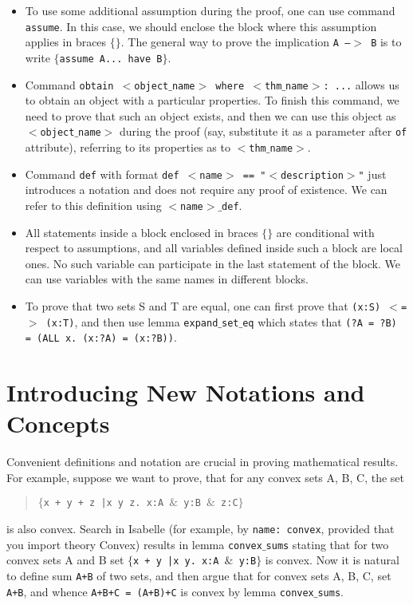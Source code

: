 \documentclass[11pt]{article}
\newcommand{\prog}[1]{\par\noindent\begin{quote}#1\end{quote}\par\noindent}
\begin{document}
\begin{itemize}

    \item To use some additional assumption during the proof, one can use command {\tt assume}. In this case, we should enclose the block where this assumption applies in braces $\{\}$. The general way to prove the implication {\tt A --$>$ B} is to write {\tt $\{$assume A... have B$\}$}.

    \item Command {\tt obtain $<$object$\_$name$>$ where $<$thm$\_$name$>$: ...} allows us to obtain an object with a particular properties. To finish this command, we need to prove that such an object exists, and then we can use this object as {\tt $<$object$\_$name$>$} during the proof (say, substitute it as a parameter after {\tt of} attribute), referring to its properties as to {\tt $<$thm$\_$name$>$}.

    \item  Command {\tt def} with format {\tt def $<$name$>$ == "$<$description$>$"} just introduces a notation and does not require any proof of existence. We can refer to this definition using {\tt $<$name$>\_$def}.

    \item All statements inside a block enclosed in braces $\{\}$ are conditional with respect to assumptions, and all variables defined inside such a block are local ones. No such variable can participate in the last statement of the block. We can use variables with the same names in different blocks.

    \item  To prove that two sets S and T are equal, one can first prove that {\tt (x:S) $<$=$>$ (x:T)}, and then use lemma {\tt expand$\_$set$\_$eq} which states that {\tt (?A = ?B) = (ALL x.~(x:?A) = (x:?B))}.

\end{itemize}


\section{Introducing New Notations and Concepts}

Convenient definitions and notation are crucial in proving mathematical results. For example, suppose we want to prove, that for any convex sets A, B, C, the set

\prog{\tt $\{$x + y + z |x y z.~x:A $\&$ y:B $\&$ z:C$\}$}%
is also convex. Search in Isabelle (for example, by {\tt name:~convex}, provided that you import theory Convex) results in lemma {\tt convex$\_$sums} stating that for two convex sets A and B set {\tt $\{$x + y |x y.~x:A $\&$ y:B$\}$} is convex. Now it is natural to define sum {\tt A+B} of two sets, and then argue that for convex sets A, B, C, set {\tt A+B}, and whence {\tt A+B+C = (A+B)+C} is convex by lemma {\tt convex$\_$sums}.
\end{document}
